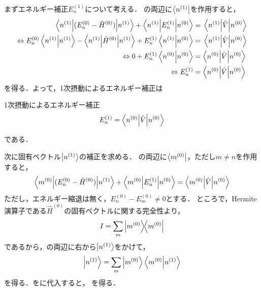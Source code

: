 \documentclass{report}
\begin{document}
  まずエネルギー補正$E_n^{(1)}$について考える．
  の両辺に$\bra{n^{(1)}}$を作用すると，
  \begin{align}
    \ev**{(E_n^{(0)} - \hat{H}^{(0)})}{n^{(1)}} + \mel**{n^{(1)}}{E_n^{(1)}}{n^{(0)}} &= \mel{n^{(1)}}{\hat{V}}{n^{(0)}} \\ 
    \Leftrightarrow E_n^{(0)}\braket{n^{(1)}} - \ev**{\hat{H}^{(0)}}{n^{(1)}} + E_n^{(1)}\braket{n^{(1)}}{n^{(0)}} &= \mel{n^{(1)}}{\hat{V}}{n^{(0)}} \\ 
    \Leftrightarrow 0 + E_n^{(1)}\braket{n^{(0)}} &= \ev**{\hat{V}}{n^{(0)}} \\ 
    \Leftrightarrow E_n^{(1)} &= \ev**{\hat{V}}{n^{(0)}}
  \end{align}
  を得る．よって，1次摂動によるエネルギー補正は
  \begin{itembox}[l]{1次摂動によるエネルギー補正}
    \begin{align}
      E_n^{(1)} = \ev**{\hat{V}}{n^{(0)}}
    \end{align}
  \end{itembox}
  である．
  \par
  次に固有ベクトル$\ket{n^{(1)}}$の補正を求める．
  の両辺に$\bra{m^{(0)}}$，ただし$m\neq n$を作用すると，
  \begin{align}
    \mel**{m^{(0)}}{(E_n^{(0)} - \hat{H}^{(0)})}{n^{(1)}} + \mel**{m^{(0)}}{E_n^{(1)}}{n^{(0)}} &= \mel**{m^{(0)}}{\hat{V}}{n^{(0)}} \\ 
  \end{align}
  ただし，エネルギー縮退は無く，$E_n^{(0)}-E_m^{(0)} \neq 0$とする．
  ところで，Hermite演算子である$\hat{H}^{(0)}$の固有ベクトルに関する完全性より，
  \begin{align}
    I = \sum_{m}\ketbra{m^{(0)}}{m^{(0)}}\label{completeness}
  \end{align}
  であるから，の両辺に右から$\ket{n^{(1)}}$をかけて，
  \begin{align}
    \ket{n^{(1)}} = \sum_{m}\ket{m^{(0)}}\braket{m^{(0)}}{n^{(1)}}\label{n1-completeness-expantion}
  \end{align}
  を得る．をに代入すると，
  を得る．
\end{document}
